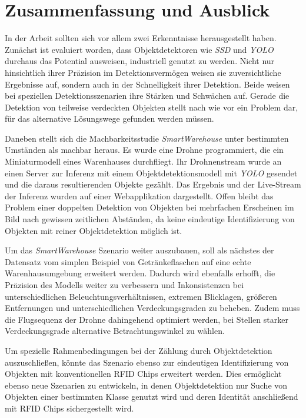 \chapter{Zusammenfassung und Ausblick}

In der Arbeit sollten sich vor allem zwei Erkenntnisse herausgestellt haben. Zunächst ist evaluiert worden, dass Objektdetektoren wie \textit{SSD} und \textit{YOLO} durchaus das Potential ausweisen, industriell genutzt zu werden. Nicht nur hinsichtlich ihrer Präzision im Detektionsvermögen weisen sie zuversichtliche Ergebnisse auf, sondern auch in der Schnelligkeit ihrer Detektion. Beide weisen bei speziellen Detektionsszenarien ihre Stärken und Schwächen auf. Gerade die Detektion von teilweise verdeckten Objekten stellt nach wie vor ein Problem dar, für das alternative Lösungswege gefunden werden müssen. 

Daneben stellt sich die Machbarkeitsstudie \textit{SmartWarehouse} unter bestimmten Umständen als machbar heraus. Es wurde eine Drohne programmiert, die ein Miniaturmodell eines Warenhauses durchfliegt. Ihr Drohnenstream wurde an einen Server zur Inferenz mit einem Objektdetektionsmodell mit \textit{YOLO} gesendet und die daraus resultierenden Objekte gezählt. Das Ergebnis und der Live-Stream der Inferenz wurden auf einer Webapplikation dargestellt. Offen bleibt das Problem einer doppelten Detektion von Objekten bei mehrfachen Erscheinen im Bild nach gewissen zeitlichen Abständen, da keine eindeutige Identifizierung von Objekten mit reiner Objektdetektion möglich ist.

Um das \textit{SmartWarehouse} Szenario weiter auszubauen, soll als nächstes der Datensatz vom simplen Beispiel von Getränkeflaschen auf eine echte Warenhausumgebung erweitert werden. Dadurch wird ebenfalls erhofft, die Präzision des Modells weiter zu verbessern und Inkonsistenzen bei unterschiedlichen Beleuchtungsverhältnissen, extremen Blicklagen, größeren Entfernungen und unterschiedlichen Verdeckungsgraden zu beheben. Zudem muss die Flugsequenz der Drohne dahingehend optimiert werden, bei Stellen starker Verdeckungsgrade alternative Betrachtungswinkel zu wählen. 

Um spezielle Rahmenbedingungen bei der Zählung durch Objektdetektion auszuschließen, könnte das Szenario ebenso zur eindeutigen Identifizierung von Objekten mit konventionellen RFID Chips erweitert werden. Dies ermöglicht ebenso neue Szenarien zu entwickeln, in denen Objektdetektion nur Suche von Objekten einer bestimmten Klasse genutzt wird und deren Identität anschließend mit RFID Chips sichergestellt wird. 